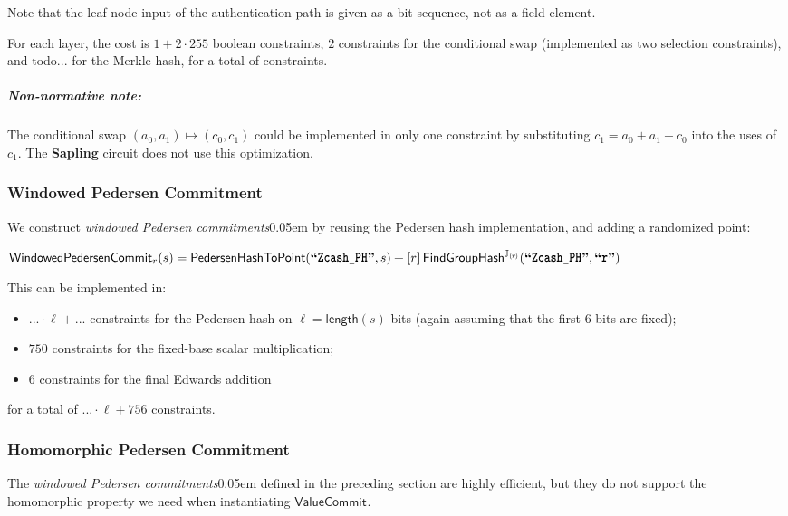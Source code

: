\documentclass{article}
\let\oldtexttt\texttt
\renewcommand{\texttt}[1]{\scalebox{0.97}[1.07]{\oldtexttt{#1}}}
\newcommand{\introlist}{\needspace{15ex}}
\newcommand{\introsection}{\needspace{35ex}}
\numberwithin{theorem}{subsection}
\newcommand{\todo}[1]{{\color{Sepia}\sf{TODO: #1}}}
\newcommand{\term}[1]{\textsl{#1}\kern 0.05em\xspace}
\newcommand{\titleterm}[1]{#1}
\newcommand{\termbf}[1]{\textbf{#1}\xspace}
\newcommand{\Sapling}{\termbf{Sapling}}
\newcommand{\windowedPedersenCommitments}{\term{windowed Pedersen commitments}}
\newcommand{\WindowedPedersenCommitment}{\titleterm{Windowed Pedersen Commitment}}
\newcommand{\HomomorphicPedersenCommitment}{\titleterm{Homomorphic Pedersen Commitment}}
\newcommand{\length}{\mathsf{length}}
\newcommand{\ascii}[1]{\textbf{``\texttt{#1}''}}
\newcommand{\smult}{\!\cdot\!}
\newcommand{\scalarmult}[2]{\boldsymbol{[}{#1}\boldsymbol{]}\,{#2}}
\newcommand{\ValueCommitAlg}{\mathsf{ValueCommit}}
\newcommand{\ValueCommit}[1]{\ValueCommitAlg_{#1}}
\newcommand{\subgroupr}{(\kern-0.075emr\kern-0.075em)}
\newcommand{\FindGroupHash}{\mathsf{FindGroupHash}}
\newcommand{\SubgroupJ}{\mathbb{J}_{\subgroupr}}
\newcommand{\FindGroupJHash}{\FindGroupHash^{\SubgroupJ}}
\newcommand{\FindGroupJHashOf}[1]{\FindGroupJHash\!\left({#1}\right)\!}
\newcommand{\PedersenHashToPoint}{\mathsf{PedersenHashToPoint}}
\newcommand{\WindowedPedersenCommitAlg}{\mathsf{WindowedPedersenCommit}}
\newcommand{\WindowedPedersenCommit}[1]{\WindowedPedersenCommitAlg_{#1}}
\newcommand{\nnote}[1]{\subparagraph{Non-normative note:}{#1}}
\begin{document}
{Note that the leaf node input of the authentication path is given as a bit sequence,
not as a field element.

For each layer, the cost is $1 + 2 \smult 255$ boolean constraints,
$2$ constraints for the conditional swap (implemented as two selection
constraints), and todo{...} for the Merkle hash, for a total of \todo{...}
constraints.

\nnote{The conditional swap $(a_0, a_1) \mapsto (c_0, c_1)$ could be implemented
in only one constraint by substituting $c_1 = a_0 + a_1 - c_0$ into the
uses of $c_1$. The \Sapling circuit does not use this optimization.}


\introsection
\subsubsection{\WindowedPedersenCommitment} \label{cctwindowedcommit}

We construct \windowedPedersenCommitments by reusing the Pedersen hash
implementation, and adding a randomized point:

\begin{formulae}
  \item $\WindowedPedersenCommit{r}(s) =
           \PedersenHashToPoint(\ascii{Zcash\_PH}, s) + \scalarmult{r}{\FindGroupJHashOf{\ascii{Zcash\_PH}, \ascii{r}}}$
\end{formulae}

\introlist
This can be implemented in:
\begin{itemize}
  \item $... \smult \ell + ...$ constraints for the Pedersen hash on
        $\ell = \length(s)$ bits (again assuming that the first $6$ bits are fixed);
  \item $750$ constraints for the fixed-base scalar multiplication;
  \item $6$ constraints for the final Edwards addition
\end{itemize}
for a total of $... \smult \ell + 756$ constraints.


\subsubsection{\HomomorphicPedersenCommitment} \label{ccthomomorphiccommit}

The \windowedPedersenCommitments defined in the preceding section are
highly efficient, but they do not support the homomorphic property we
need when instantiating $\ValueCommit{}$.

}
\end{document}
